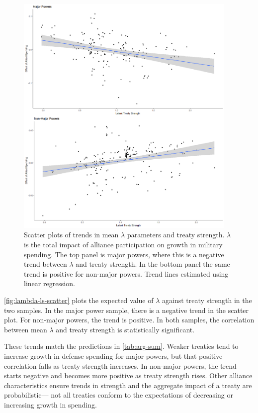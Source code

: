 \documentclass[12pt]{article}
\begin{document}
\begin{figure}[htbp]
	\centering
		\includegraphics[width=0.95\textwidth]{../figures/lambda-ls-scatter.png}
	\caption{Scatter plots of trends in mean $\lambda$ parameters and treaty strength. $\lambda$ is the total impact of alliance participation on growth in military spending. The top panel is major powers, where this is a negative trend between $\lambda$ and treaty strength. In the bottom panel the same trend is positive for non-major powers. Trend lines estimated using linear regression.}
	\label{fig:lambda-ls-scatter}
\end{figure}


\autoref{fig:lambda-ls-scatter} plots the expected value of $\lambda$ against treaty strength in the two samples. 
In the major power sample, there is a negative trend in the scatter plot.
For non-major powers, the trend is positive.
In both samples, the correlation between mean $\lambda$ and treaty strength is statistically significant. 


These trends match the predictions in \autoref{tab:arg-sum}.  
Weaker treaties tend to increase growth in defense spending for major powers, but that positive correlation falls as treaty strength increases. 
In non-major powers, the trend starts negative and becomes more positive as treaty strength rises. 
Other alliance characteristics ensure trends in strength and the aggregate impact of a treaty are probabilistic--- not all treaties conform to the expectations of decreasing or increasing growth in spending. 
\end{document}
